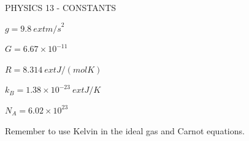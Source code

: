 PHYSICS 13 - CONSTANTS

$g=9.8\ 	ext{m/s}^2$

$G=6.67\times10^{-11}$

$R=8.314\ 	ext{J/(mol K)}$

$k_B=1.38\times10^{-23}\ 	ext{J/K}$

$N_A=6.02\times10^{23}$

Remember to use Kelvin in the ideal gas and Carnot equations.
